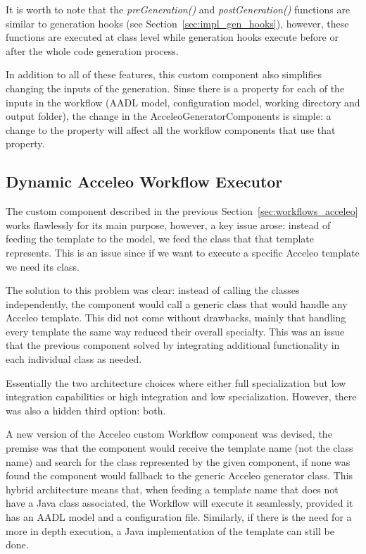 It is worth to note that the \textit{preGeneration()} and \textit{postGeneration()} functions are similar to generation hooks (see Section~\ref{sec:impl_gen_hooks}), however, these functions are executed at class level while generation hooks execute before or after the whole code generation process.

In addition to all of these features, this custom component also simplifies changing the inputs of the generation. Sinse there is a property for each of the inputs in the workflow (\gls{AADL} model, configuration model, working directory and output folder), the change in the AcceleoGeneratorComponents is simple: a change to the property will affect all the workflow components that use that property.


\subsection{Dynamic Acceleo Workflow Executor}
\label{sec:workflows_dynamic_executor}

The custom component described in the previous Section~\ref{sec:workflows_acceleo} works flawlessly for its main purpose, however, a key issue arose: instead of feeding the template to the model, we feed the class that that template represents. This is an issue since if we want to execute a specific Acceleo template we need its class.

The solution to this problem was clear: instead of calling the classes independently, the component would call a generic class that would handle any Acceleo template. This did not come without drawbacks, mainly that handling every template the same way reduced their overall specialty. This was an issue that the previous component solved by integrating additional functionality in each individual class as needed.

Essentially the two architecture choices where either full specialization but low integration capabilities or high integration and low specialization. However, there was also a hidden third option: both.

A new version of the Acceleo custom Workflow component was devised, the premise was that the component would receive the template name (not the class name) and search for the class represented by the given component, if none was found the component would fallback to the generic Acceleo generator class. This hybrid architecture means that, when feeding a template name that does not have a Java class associated, the Workflow will execute it seamlessly, provided it has an \gls{AADL} model and a configuration file. Similarly, if there is the need for a more in depth execution, a Java implementation of the template can still be done.


